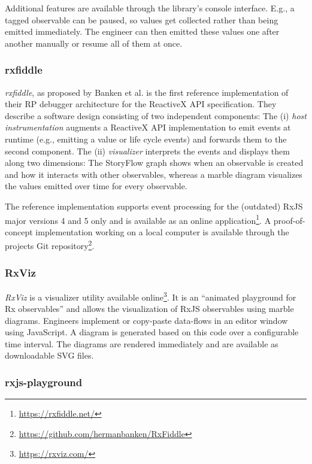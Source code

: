 \documentclass[sigplan,screen]{acmart}
\begin{document}
Additional features are available through the library's console interface. E.g., a tagged observable can be paused, so values get collected rather than being emitted immediately. The engineer can then emitted these values one after another manually or resume all of them at once.

\subsubsection{rxfiddle}

\emph{rxfiddle}, as proposed by Banken et al.\cite{10.1145/3180155.3180156} is the first reference implementation of their RP debugger architecture for the ReactiveX API specification. They describe a software design consisting of two independent components: The (i) \emph{host instrumentation} augments a ReactiveX API implementation to emit events at runtime (e.g., emitting a value or life cycle events) and forwards them to the second component. The (ii) \emph{visualizer} interprets the events and displays them along two dimensions: The StoryFlow graph\cite{YWu2013a} shows when an observable is created and how it interacts with other observables, whereas a marble diagram visualizes the values emitted over time for every observable.

The reference implementation supports event processing for the (outdated) RxJS major versions 4 and 5 only and is available as an online application\footnote{\url{https://rxfiddle.net/}}. A proof-of-concept implementation working on a local computer is available through the projects Git repository\footnote{\url{https://github.com/hermanbanken/RxFiddle}}.

\subsubsection{RxViz}

\emph{RxViz} is a visualizer utility available online\footnote{\url{https://rxviz.com/}}. It is an ``animated playground for Rx observables''\cite{rxviz} and allows the visualization of RxJS observables using marble diagrams. Engineers implement or copy-paste data-flows in an editor window using JavaScript. A diagram is generated based on this code over a configurable time interval. The diagrams are rendered immediately and are available as downloadable SVG files.

\subsubsection{rxjs-playground}
\end{document}
